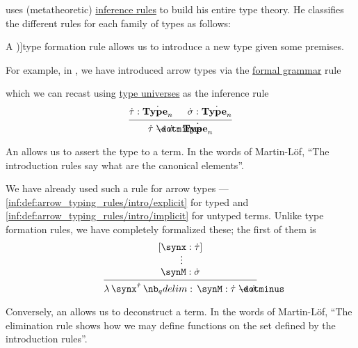 \begin{remark}\label{rem:type_theory_rule_classification}
   uses (metatheoretic) \hyperref[def:inference_rule]{inference rules} to build his entire type theory. He classifies the different rules for each family of types as follows:
  \begin{thmenum}
     A \term[en=formation (rule) (\cite[\S 8.1.9]{Mimram2020ProgramEqualsProof})]{type formation} rule allows us to introduce a new type given some premises.

    For example, in , we have introduced arrow types via the \hyperref[def:formal_grammar/schema]{formal grammar} rule
    \begin{bnf*}
       {\bnftsq{(} \bnfsp {} \bnfsp \bnftsq{\( \synimplies \)} \bnfsp {} \bnfsp \bnftsq{)}}
    \end{bnf*}
    which we can recast using \hyperref[rem:type_universes]{type universes} as the inference rule
    \begin{equation*}
      \begin{prooftree}
        \hypo{ \syn\tau: \syn{\op*{Type}_n} }
        \hypo{ \syn\sigma: \syn{\op*{Type}_n} }
        \infer2{ \syn\tau \synimplies \syn\sigma: \syn{\op*{Type}_n} }
      \end{prooftree}
    \end{equation*}

     An  allows us to assert the type to a term. In the words of Martin-L\"of, \enquote{The introduction rules say what are the canonical elements}.

    We have already used such a rule for arrow types --- \ref{inf:def:arrow_typing_rules/intro/explicit} for typed and \ref{inf:def:arrow_typing_rules/intro/implicit} for untyped terms. Unlike type formation rules, we have completely formalized these; the first of them is
    \begin{equation*}
      \begin{prooftree}
        \hypo{ [\synx: \syn\tau] }
        \ellipsis {} { \synM: \syn\sigma }
        \infer1{ \qabs {\synx^{\syn\tau}} \synM: \syn\tau \synimplies \syn\sigma }
      \end{prooftree}
    \end{equation*}

     Conversely, an  allows us to deconstruct a term. In the words of Martin-L\"of, \enquote{The elimination rule shows how we may define functions on the set defined by the introduction rules}.


\end{thmenum}
\end{remark}
